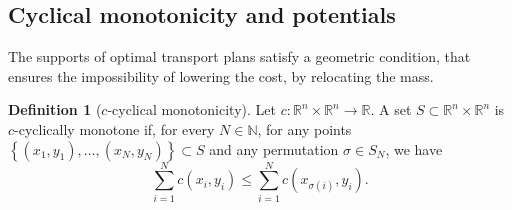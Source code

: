 \documentclass[reqno]{amsart}
\theoremstyle{plain}
\theoremstyle{definition}
\newtheorem{Def}[thm]{Definition}
\theoremstyle{remark}
\newcommand{\R}{\mathbb{R}}
\begin{document}
\subsection{Cyclical monotonicity and potentials}
           The supports of optimal transport plans satisfy a geometric condition, that ensures the impossibility of lowering the cost, by relocating the mass.
        \begin{Def}[$c$-cyclical monotonicity]
			Let $c:\R^n\times \R^n \to \R$. A set $S\subset \R^n \times \R^n$ is $c$-cyclically monotone if, for every $N\in\mathbb{N}$, for any points $\left\{(x_1,y_1),\dots,(x_N,y_N)\right\} \subset S$ and any permutation $\sigma\in S_N$, we have 
			\begin{equation}
				\sum_{i=1}^{N}c(x_i,y_i)\leq\sum_{i=1}^{N}c(x_{\sigma(i)},y_i).
			\end{equation}
		\end{Def}
\end{document}
